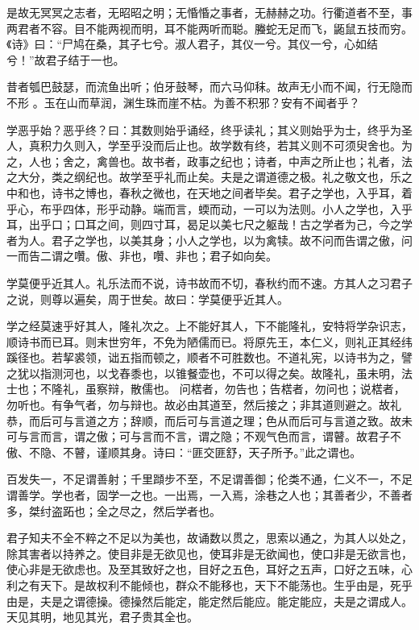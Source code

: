 是故无冥冥之志者，无昭昭之明；无惛惛之事者，无赫赫之功。行衢道者不至，事两君者不容。目不能两视而明，耳不能两听而聪。螣蛇无足而飞，鼫鼠五技而穷。《诗》曰：“尸鸠在桑，其子七兮。淑人君子，其仪一兮。其仪一兮，心如结兮！”故君子结于一也。

昔者瓠巴鼓瑟，而流鱼出听；伯牙鼓琴，而六马仰秣。故声无小而不闻，行无隐而不形 。玉在山而草润，渊生珠而崖不枯。为善不积邪？安有不闻者乎？

学恶乎始？恶乎终？曰：其数则始乎诵经，终乎读礼；其义则始乎为士，终乎为圣人，真积力久则入，学至乎没而后止也。故学数有终，若其义则不可须臾舍也。为之，人也；舍之，禽兽也。故书者，政事之纪也；诗者，中声之所止也；礼者，法之大分，类之纲纪也。故学至乎礼而止矣。夫是之谓道德之极。礼之敬文也，乐之中和也，诗书之博也，春秋之微也，在天地之间者毕矣。君子之学也，入乎耳，着乎心，布乎四体，形乎动静。端而言，蝡而动，一可以为法则。小人之学也，入乎耳，出乎口；口耳之间，则四寸耳，曷足以美七尺之躯哉！古之学者为己，今之学者为人。君子之学也，以美其身；小人之学也，以为禽犊。故不问而告谓之傲，问一而告二谓之囋。傲、非也，囋、非也；君子如向矣。
 
学莫便乎近其人。礼乐法而不说，诗书故而不切，春秋约而不速。方其人之习君子之说，则尊以遍矣，周于世矣。故曰：学莫便乎近其人。

学之经莫速乎好其人，隆礼次之。上不能好其人，下不能隆礼，安特将学杂识志，顺诗书而已耳。则末世穷年，不免为陋儒而已。将原先王，本仁义，则礼正其经纬蹊径也。若挈裘领，诎五指而顿之，顺者不可胜数也。不道礼宪，以诗书为之，譬之犹以指测河也，以戈舂黍也，以锥餐壶也，不可以得之矣。故隆礼，虽未明，法士也；不隆礼，虽察辩，散儒也。
问楛者，勿告也；告楛者，勿问也；说楛者，勿听也。有争气者，勿与辩也。故必由其道至，然后接之；非其道则避之。故礼恭，而后可与言道之方；辞顺，而后可与言道之理；色从而后可与言道之致。故未可与言而言，谓之傲；可与言而不言，谓之隐；不观气色而言，谓瞽。故君子不傲、不隐、不瞽，谨顺其身。诗曰：“匪交匪舒，天子所予。”此之谓也。

百发失一，不足谓善射；千里蹞步不至，不足谓善御；伦类不通，仁义不一，不足谓善学。学也者，固学一之也。一出焉，一入焉，涂巷之人也；其善者少，不善者多，桀纣盗跖也；全之尽之，然后学者也。

君子知夫不全不粹之不足以为美也，故诵数以贯之，思索以通之，为其人以处之，除其害者以持养之。使目非是无欲见也，使耳非是无欲闻也，使口非是无欲言也，使心非是无欲虑也。及至其致好之也，目好之五色，耳好之五声，口好之五味，心利之有天下。是故权利不能倾也，群众不能移也，天下不能荡也。生乎由是，死乎由是，夫是之谓德操。德操然后能定，能定然后能应。能定能应，夫是之谓成人。天见其明，地见其光，君子贵其全也。